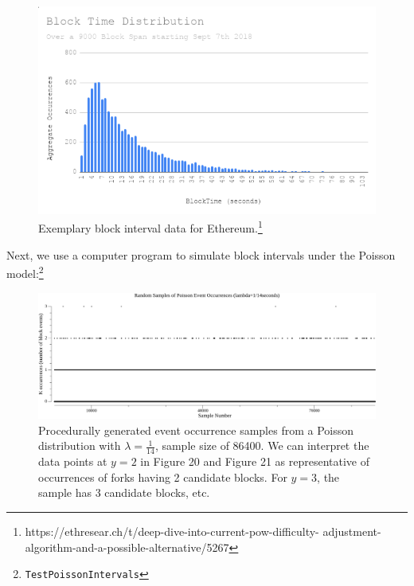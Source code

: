 \documentclass[11pt]{article}
\theoremstyle{plain}
\begin{document}
\begin{figure}[tph]
    \centering

\includegraphics[width=1.0\textwidth]{vis_data_blockinterval_distribution.png}
    \caption{
      Exemplary block interval data for
Ethereum.\footnote{https://ethresear.ch/t/deep-dive-into-current-pow-difficulty-
adjustment-algorithm-and-a-possible-alternative/5267}
    }
\end{figure}

Next, we use a computer program to simulate block intervals under the Poisson
model:\footnote{\texttt{TestPoissonIntervals}}

\begin{figure}[tph]
    \label{vis_poisson_samples_events_86400}
    \centering
    \includegraphics[width=1.0\textwidth]{go-block-step/out/vis_poisson_samples_events_86400.png}
    \caption{
        Procedurally generated event occurrence samples from a Poisson distribution
        with $\lambda = \frac{1}{14}$, sample size of 86400.
        We can interpret the data points at $y=2$ in Figure 20 and Figure 21 as
        representative of occurrences of forks having 2 candidate blocks.
        For $y=3$, the sample has 3 candidate blocks, etc.
    }
\end{figure}
\end{document}
